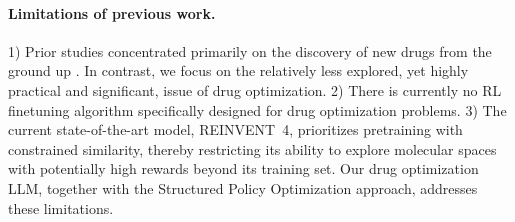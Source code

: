 \paragraph{Limitations of previous work.} 

1) Prior studies concentrated primarily on the discovery of new drugs from the ground up \citep{atance2022novo, popova2018deep, zhang2023universal}. In contrast, we focus on the relatively less explored, yet highly practical and significant, issue of drug optimization.
2) {There is currently no RL finetuning algorithm specifically designed for drug optimization problems.}
{3) The current state-of-the-art model, REINVENT~4, prioritizes pretraining with constrained similarity, thereby restricting its ability to explore molecular spaces with potentially high rewards beyond its training set.
Our drug optimization LLM, together with the Structured Policy Optimization approach, addresses these limitations.}














